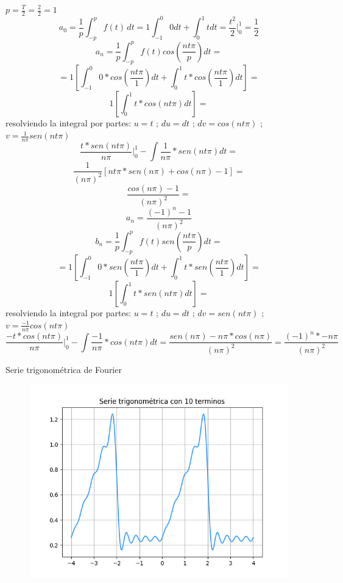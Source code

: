 \documentclass[
	12pt, %
]{fphw}
\begin{document}
$p=\frac{T}{2}=\frac{2}{2}=1$\\
\dotfill
\[a_{0} = \frac{1}{p}\int_{-p}^{p} f(t) \,dt = 1\int_{-1}^{0}0 dt + \int_{0}^{1}t dt =  \frac{t^{2}}{2}\Big|_0^1 = \frac{1}{2} \]
\dotfill
\[a_{n}=\frac{1}{p}\int_{-p}^{p} f(t) cos(\frac{nt\pi}{p}) dt =\]
\[= 1\left[ \int_{-1}^{0} 0*cos(\frac{nt\pi}{1}) dt + \int_{0}^{1} t*cos(\frac{nt\pi}{1}) dt\right]=\]
\[ 1\left[ \int_{0}^{1} t*cos(nt\pi) dt\right]=\]
resolviendo la integral por partes: $u=t$ ; $du=dt$ ; $dv=cos(nt\pi)$ ; $v= \frac{1}{n\pi}sen(nt\pi)$
\[ \frac{t*sen(nt\pi)}{n\pi} \Big|_0^1 - \int \frac{1}{n\pi}*sen(nt\pi) dt =\]
\[ \frac{1}{(n\pi)^{2}} \left[ nt\pi *sen(n\pi) + cos(n\pi) -1 \right] = \]
\[ \frac{cos(n\pi)-1}{(n\pi)^{2}}=\]
\[ a_{n} = \frac{(-1)^{n}-1}{(n\pi)^{2}}\]
\dotfill
\[b_{n}=\frac{1}{p}\int_{-p}^{p} f(t) sen(\frac{nt\pi}{p}) dt =\]
\[= 1\left[ \int_{-1}^{0} 0*sen(\frac{nt\pi}{1}) dt + \int_{0}^{1} t*sen(\frac{nt\pi}{1}) dt\right]=\]
\[ 1\left[ \int_{0}^{1} t*sen(nt\pi) dt\right]=\]
resolviendo la integral por partes: $u=t$ ; $du=dt$ ; $dv=sen(nt\pi)$ ; $v= \frac{-1}{n\pi}cos(nt\pi)$
\[ \frac{-t*cos(nt\pi)}{n\pi} \Big|_0^1 - \int \frac{-1}{n\pi}*cos(nt\pi) dt =\frac{sen(n\pi)-n\pi * cos(n\pi)}{(n\pi)^{2}}= \frac{(-1)^{n}*-n\pi}{(n\pi)^{2}}\]

\newpage
{\color{teal}
\dotfill
Serie trigonométrica de Fourier
\dotfill}
\begin{figure}[H]
  \centering
  \includegraphics[scale=0.8]{images/funcion1_10.jpg}
\end{figure}
\end{document}
